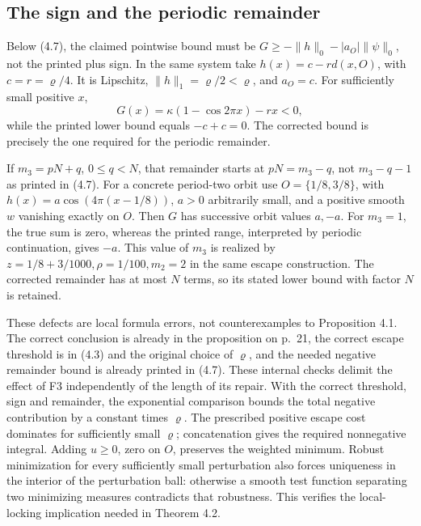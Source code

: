\documentclass[10pt]{article}
\begin{document}
\subsection*{The sign and the periodic remainder}
Below (4.7), the claimed pointwise bound must be \(G\ge-\|h\|_0-|a_O|\|\psi\|_0\), not the printed plus sign. In the same system take \(h(x)=c-rd(x,O)\), with \(c=r=\varrho/4\). It is Lipschitz, \(\|h\|_1=\varrho/2<\varrho\), and \(a_O=c\). For sufficiently small positive \(x\), \[G(x)=\kappa(1-\cos2\pi x)-rx<0,\] while the printed lower bound equals \(-c+c=0\). The corrected bound is precisely the one required for the periodic remainder.\par
If \(m_3=pN+q\), \(0\le q<N\), that remainder starts at \(pN=m_3-q\), not \(m_3-q-1\) as printed in (4.7). For a concrete period-two orbit use \(O=\{1/8,3/8\}\), with \(h(x)=a\cos(4\pi(x-1/8))\), \(a>0\) arbitrarily small, and a positive smooth \(w\) vanishing exactly on \(O\). Then \(G\) has successive orbit values \(a,-a\). For \(m_3=1\), the true sum is zero, whereas the printed range, interpreted by periodic continuation, gives \(-a\). This value of \(m_3\) is realized by \(z=1/8+3/1000,\rho=1/100,m_2=2\) in the same escape construction. The corrected remainder has at most \(N\) terms, so its stated lower bound with factor \(N\) is retained.\par
These defects are local formula errors, not counterexamples to Proposition 4.1. The correct conclusion is already in the proposition on p. 21, the correct escape threshold is in (4.3) and the original choice of \(\varrho\), and the needed negative remainder bound is already printed in (4.7). These internal checks delimit the effect of F3 independently of the length of its repair. With the correct threshold, sign and remainder, the exponential comparison bounds the total negative contribution by a constant times \(\varrho\). The prescribed positive escape cost dominates for sufficiently small \(\varrho\); concatenation gives the required nonnegative integral. Adding \(u\ge0\), zero on \(O\), preserves the weighted minimum. Robust minimization for every sufficiently small perturbation also forces uniqueness in the interior of the perturbation ball: otherwise a smooth test function separating two minimizing measures contradicts that robustness. This verifies the local-locking implication needed in Theorem 4.2.\par
\end{document}
